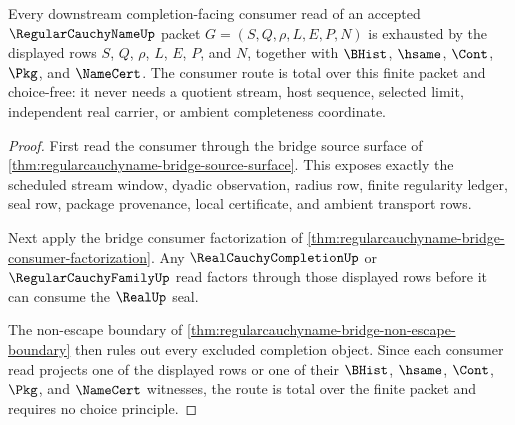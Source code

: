 \begin{theorem}
\label{thm:regularcauchyname-finite-consumer-choice-free-totality}
Every downstream completion-facing consumer read of an accepted $\RegularCauchyNameUp$ packet $G=(S,Q,\rho,L,E,P,N)$ is exhausted by the displayed rows $S$, $Q$, $\rho$, $L$, $E$, $P$, and $N$, together with $\BHist$, $\hsame$, $\Cont$, $\Pkg$, and $\NameCert$. The consumer route is total over this finite packet and choice-free: it never needs a quotient stream, host sequence, selected limit, independent real carrier, or ambient completeness coordinate.
\end{theorem}
\begin{proof}
First read the consumer through the bridge source surface of \autoref{thm:regularcauchyname-bridge-source-surface}. This exposes exactly the scheduled stream window, dyadic observation, radius row, finite regularity ledger, seal row, package provenance, local certificate, and ambient transport rows.

Next apply the bridge consumer factorization of \autoref{thm:regularcauchyname-bridge-consumer-factorization}. Any $\RealCauchyCompletionUp$ or $\RegularCauchyFamilyUp$ read factors through those displayed rows before it can consume the $\RealUp$ seal.

The non-escape boundary of \autoref{thm:regularcauchyname-bridge-non-escape-boundary} then rules out every excluded completion object. Since each consumer read projects one of the displayed rows or one of their $\BHist$, $\hsame$, $\Cont$, $\Pkg$, and $\NameCert$ witnesses, the route is total over the finite packet and requires no choice principle.
\end{proof}

